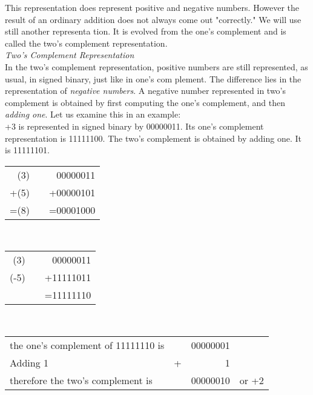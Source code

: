 \documentclass[12pt]{book}
\begin{document}
This representation does represent positive and negative numbers. However the result of an ordinary addition does not always come out "correctly." We will use still another representa tion. It is evolved from the one's complement and is called the two's complement representation.\\

\noindent\textit{Two's Complement Representation}\\

In the two's complement representation, positive numbers are still represented, as usual, in signed binary, just like in one's com plement. The difference lies in the representation of \textit{negative numbers}. A negative number represented in two's complement is obtained by first computing the one's complement, and then \textit{adding one}. Let us examine this in an example:\\

+3 is represented in signed binary by 00000011. Its one's complement representation is 11111100. The two's complement is obtained by adding one. It is 11111101.\\

\begin{table}[H]\begin{center}
\begin{tabular}{rlr}
(3)  &  & 00000011  \\
+(5) &  & +00000101 \\ \hline
=(8) &  & =00001000
\end{tabular}\end{center}
\end{table}
\\

\begin{table}[H]\begin{center}
\begin{tabular}{rlr}
(3)  &  & 00000011  \\
(-5) &  & +11111011 \\ \hline
     &  & =11111110
\end{tabular}\end{center}
\end{table}
\\
\begin{table}[H]
\begin{tabular}{lrrl}
the one's complement of 11111110 is &   & 00000001 &       \\
Adding 1                            & + & 1        &       \\ \cline{2-3}
therefore the two's complement is   &   & 00000010 & or +2
\end{tabular}
\end{table}
\\
\end{document}
